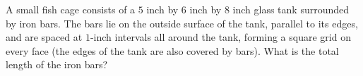 A small fish cage consists of a $5$ inch by $6$ inch by $8$ inch glass tank surrounded by iron bars. The bars lie on the outside surface of the tank, parallel to its edges, and are spaced at $1$-inch intervals all around the tank, forming a square grid on every face (the edges of the tank are also covered by bars). What is the total length of the iron bars?
